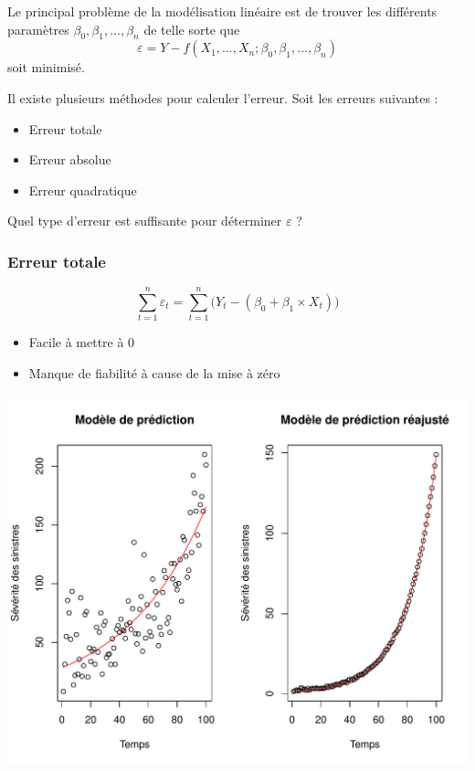 \documentclass[11pt,french]{report}
\begin{document}
Le principal problème de la modélisation linéaire est de trouver les différents paramètres $\beta_0, \beta_1, ..., \beta_n$ de telle sorte que
\begin{equation}
\varepsilon = Y - f(X_1,...,X_n; \beta_0, \beta_1,...,\beta_n)
\end{equation}
soit minimisé.
\bigskip

Il existe plusieurs méthodes pour calculer l'erreur. Soit les erreurs suivantes :
\begin{itemize}
\item Erreur totale
\item Erreur absolue
\item Erreur quadratique
\end{itemize}
\bigskip

Quel type d'erreur est suffisante pour déterminer $\varepsilon$ ?

\subsubsection{Erreur totale}
\begin{equation}
\displaystyle\sum_{t=1}^n \varepsilon_t = \displaystyle\sum_{t=1}^n \Big( Y_t - (\beta_0 + \beta_1\times X_t) \Big) 
\end{equation}

\bigskip
\begin{itemize}
\item Facile à mettre à 0
\item Manque de fiabilité à cause de la mise à zéro
\end{itemize}

\bigskip
\includegraphics{notes_de_cours-005}
\end{document}
